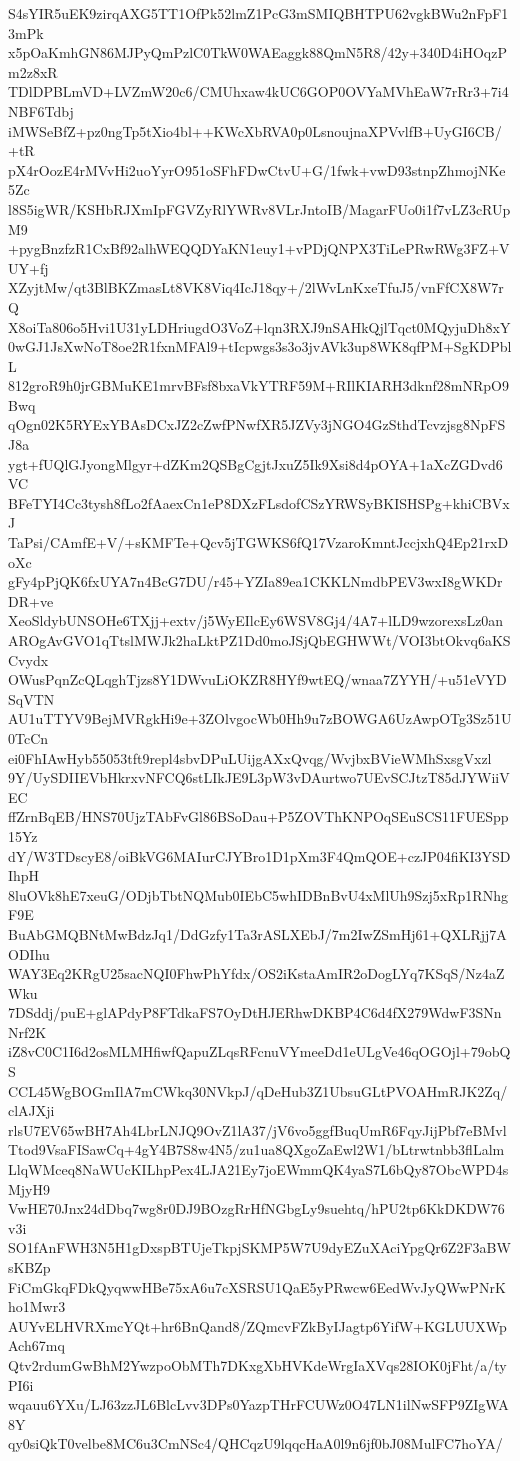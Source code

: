 S4sYIR5uEK9zirqAXG5TT1OfPk52lmZ1PcG3mSMIQBHTPU62vgkBWu2nFpF13mPk
x5pOaKmhGN86MJPyQmPzlC0TkW0WAEaggk88QmN5R8/42y+340D4iHOqzPm2z8xR
TDlDPBLmVD+LVZmW20c6/CMUhxaw4kUC6GOP0OVYaMVhEaW7rRr3+7i4NBF6Tdbj
iMWSeBfZ+pz0ngTp5tXio4bl++KWcXbRVA0p0LsnoujnaXPVvlfB+UyGI6CB/+tR
pX4rOozE4rMVvHi2uoYyrO951oSFhFDwCtvU+G/1fwk+vwD93stnpZhmojNKe5Zc
l8S5igWR/KSHbRJXmIpFGVZyRlYWRv8VLrJntoIB/MagarFUo0i1f7vLZ3cRUpM9
+pygBnzfzR1CxBf92alhWEQQDYaKN1euy1+vPDjQNPX3TiLePRwRWg3FZ+VUY+fj
XZyjtMw/qt3BlBKZmasLt8VK8Viq4IcJ18qy+/2lWvLnKxeTfuJ5/vnFfCX8W7rQ
X8oiTa806o5Hvi1U31yLDHriugdO3VoZ+lqn3RXJ9nSAHkQjlTqct0MQyjuDh8xY
0wGJ1JsXwNoT8oe2R1fxnMFAl9+tIcpwgs3s3o3jvAVk3up8WK8qfPM+SgKDPblL
812groR9h0jrGBMuKE1mrvBFsf8bxaVkYTRF59M+RIlKIARH3dknf28mNRpO9Bwq
qOgn02K5RYExYBAsDCxJZ2cZwfPNwfXR5JZVy3jNGO4GzSthdTcvzjsg8NpFSJ8a
ygt+fUQlGJyongMlgyr+dZKm2QSBgCgjtJxuZ5Ik9Xsi8d4pOYA+1aXcZGDvd6VC
BFeTYI4Cc3tysh8fLo2fAaexCn1eP8DXzFLsdofCSzYRWSyBKISHSPg+khiCBVxJ
TaPsi/CAmfE+V/+sKMFTe+Qcv5jTGWKS6fQ17VzaroKmntJccjxhQ4Ep21rxDoXc
gFy4pPjQK6fxUYA7n4BcG7DU/r45+YZIa89ea1CKKLNmdbPEV3wxI8gWKDrDR+ve
XeoSldybUNSOHe6TXjj+extv/j5WyEIlcEy6WSV8Gj4/4A7+lLD9wzorexsLz0an
AROgAvGVO1qTtslMWJk2haLktPZ1Dd0moJSjQbEGHWWt/VOI3btOkvq6aKSCvydx
OWusPqnZcQLqghTjzs8Y1DWvuLiOKZR8HYf9wtEQ/wnaa7ZYYH/+u51eVYDSqVTN
AU1uTTYV9BejMVRgkHi9e+3ZOlvgocWb0Hh9u7zBOWGA6UzAwpOTg3Sz51U0TcCn
ei0FhIAwHyb55053tft9repl4sbvDPuLUijgAXxQvqg/WvjbxBVieWMhSxsgVxzl
9Y/UySDIIEVbHkrxvNFCQ6stLIkJE9L3pW3vDAurtwo7UEvSCJtzT85dJYWiiVEC
ffZrnBqEB/HNS70UjzTAbFvGl86BSoDau+P5ZOVThKNPOqSEuSCS11FUESpp15Yz
dY/W3TDscyE8/oiBkVG6MAIurCJYBro1D1pXm3F4QmQOE+czJP04fiKI3YSDIhpH
8luOVk8hE7xeuG/ODjbTbtNQMub0IEbC5whIDBnBvU4xMlUh9Szj5xRp1RNhgF9E
BuAbGMQBNtMwBdzJq1/DdGzfy1Ta3rASLXEbJ/7m2IwZSmHj61+QXLRjj7AODIhu
WAY3Eq2KRgU25sacNQI0FhwPhYfdx/OS2iKstaAmIR2oDogLYq7KSqS/Nz4aZWku
7DSddj/puE+glAPdyP8FTdkaFS7OyDtHJERhwDKBP4C6d4fX279WdwF3SNnNrf2K
iZ8vC0C1I6d2osMLMHfiwfQapuZLqsRFcnuVYmeeDd1eULgVe46qOGOjl+79obQS
CCL45WgBOGmIlA7mCWkq30NVkpJ/qDeHub3Z1UbsuGLtPVOAHmRJK2Zq/clAJXji
rlsU7EV65wBH7Ah4LbrLNJQ9OvZ1lA37/jV6vo5ggfBuqUmR6FqyJijPbf7eBMvl
Ttod9VsaFISawCq+4gY4B7S8w4N5/zu1ua8QXgoZaEwl2W1/bLtrwtnbb3flLalm
LlqWMceq8NaWUcKILhpPex4LJA21Ey7joEWmmQK4yaS7L6bQy87ObcWPD4sMjyH9
VwHE70Jnx24dDbq7wg8r0DJ9BOzgRrHfNGbgLy9suehtq/hPU2tp6KkDKDW76v3i
SO1fAnFWH3N5H1gDxspBTUjeTkpjSKMP5W7U9dyEZuXAciYpgQr6Z2F3aBWsKBZp
FiCmGkqFDkQyqwwHBe75xA6u7cXSRSU1QaE5yPRwcw6EedWvJyQWwPNrKho1Mwr3
AUYvELHVRXmcYQt+hr6BnQand8/ZQmcvFZkByIJagtp6YifW+KGLUUXWpAch67mq
Qtv2rdumGwBhM2YwzpoObMTh7DKxgXbHVKdeWrgIaXVqs28IOK0jFht/a/tyPI6i
wqauu6YXu/LJ63zzJL6BlcLvv3DPs0YazpTHrFCUWz0O47LN1ilNwSFP9ZIgWA8Y
qy0siQkT0velbe8MC6u3CmNSc4/QHCqzU9lqqcHaA0l9n6jf0bJ08MulFC7hoYA/
